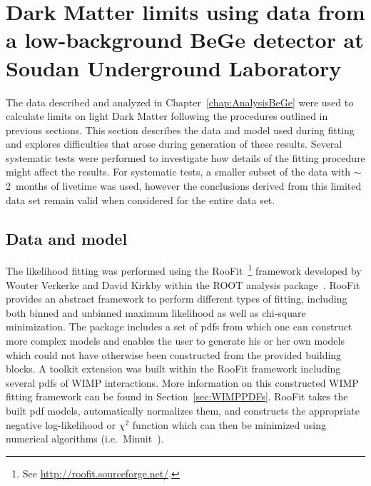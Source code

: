 \section{Dark Matter limits using data from a low-background BeGe detector at Soud\-an Underground Laboratory} 
\label{sec:DMLimitsWithSoudan}

	The data described and analyzed in Chapter~\ref{chap:AnalysisBeGe} were used to calculate limits on light Dark Matter following the procedures outlined in previous sections.  This section describes the data and model used during fitting and explores difficulties that arose during generation of these results.  Several systematic tests were performed to investigate how details of the fitting procedure might affect the results.  For systematic tests, a smaller subset of the data with $\sim$2~months of livetime was used, however the conclusions derived from this limited data set remain valid when considered for the entire data set.

	\subsection{Data and model}
	\label{sec:LimitsDataAndModel}	

The likelihood fitting was performed using the RooFit~\footnote{See \url{http://roofit.sourceforge.net/}.} framework developed by Wouter Verkerke and David Kirkby within the ROOT analysis package~\cite{Bru97}.  RooFit provides an abstract framework to perform different types of fitting, including both binned and unbinned maximum likelihood as well as chi-square minimization.  The package includes a set of pdfs from which one can construct more complex models and enables the user to generate his or her own models which could not have otherwise been constructed from the provided building blocks.  A toolkit extension was built within the RooFit framework including several pdfs of WIMP interactions.  More information on this constructed WIMP fitting framework can be found in Section~\ref{sec:WIMPPDFs}.  RooFit takes the built pdf models, automatically normalizes them, and constructs the appropriate negative log-likelihood or $\chi^{2}$ function which can then be minimized using numerical algorithms (i.e.~Minuit~\cite{James:1975dr}).

